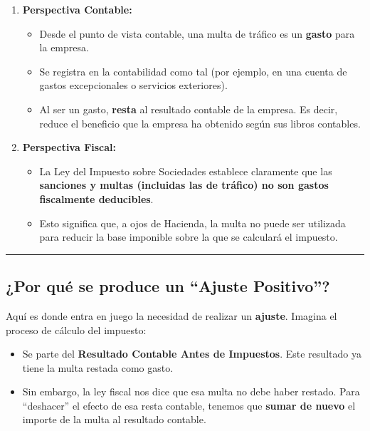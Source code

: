 \documentclass[
  paper=a4,
  ,captions=tableheading
]{scrbook}
\providecommand{\tightlist}{%
  \setlength{\itemsep}{0pt}\setlength{\parskip}{0pt}}
\begin{document}
\begin{enumerate}
\def\labelenumi{\arabic{enumi}.}
\tightlist
\item
  \textbf{Perspectiva Contable:}

  \begin{itemize}
  \tightlist
  \item
    Desde el punto de vista contable, una multa de tráfico es un
    \textbf{gasto} para la empresa.
  \item
    Se registra en la contabilidad como tal (por ejemplo, en una cuenta
    de gastos excepcionales o servicios exteriores).
  \item
    Al ser un gasto, \textbf{resta} al resultado contable de la empresa.
    Es decir, reduce el beneficio que la empresa ha obtenido según sus
    libros contables.
  \end{itemize}
\item
  \textbf{Perspectiva Fiscal:}

  \begin{itemize}
  \tightlist
  \item
    La Ley del Impuesto sobre Sociedades establece claramente que las
    \textbf{sanciones y multas (incluidas las de tráfico) no son gastos
    fiscalmente deducibles}.
  \item
    Esto significa que, a ojos de Hacienda, la multa no puede ser
    utilizada para reducir la base imponible sobre la que se calculará
    el impuesto.
  \end{itemize}
\end{enumerate}

\begin{center}\rule{0.5\linewidth}{0.5pt}\end{center}

\hypertarget{por-quuxe9-se-produce-un-ajuste-positivo}{%
\subsection{¿Por qué se produce un ``Ajuste
Positivo''?}\label{por-quuxe9-se-produce-un-ajuste-positivo}}

Aquí es donde entra en juego la necesidad de realizar un
\textbf{ajuste}. Imagina el proceso de cálculo del impuesto:

\begin{itemize}
\tightlist
\item
  Se parte del \textbf{Resultado Contable Antes de Impuestos}. Este
  resultado ya tiene la multa restada como gasto.
\item
  Sin embargo, la ley fiscal nos dice que esa multa no debe haber
  restado. Para ``deshacer'' el efecto de esa resta contable, tenemos
  que \textbf{sumar de nuevo} el importe de la multa al resultado
  contable.
\end{itemize}
\end{document}
